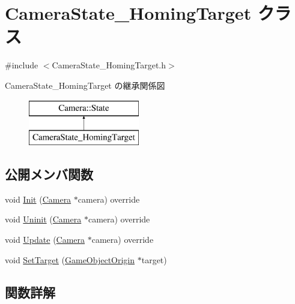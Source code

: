 \hypertarget{class_camera_state___homing_target}{}\section{Camera\+State\+\_\+\+Homing\+Target クラス}
\label{class_camera_state___homing_target}


{\ttfamily \#include $<$Camera\+State\+\_\+\+Homing\+Target.\+h$>$}

Camera\+State\+\_\+\+Homing\+Target の継承関係図\begin{figure}[H]
\begin{center}
\leavevmode
\includegraphics[height=2.000000cm]{class_camera_state___homing_target}
\end{center}
\end{figure}
\subsection*{公開メンバ関数}
\begin{DoxyCompactItemize}
\item 
void \mbox{\hyperlink{class_camera_state___homing_target_a9222190a5f26d564e99623b05941d382}{Init}} (\mbox{\hyperlink{class_camera}{Camera}} $\ast$camera) override
\item 
void \mbox{\hyperlink{class_camera_state___homing_target_a5b4abde99047da6a20f299990c259ef1}{Uninit}} (\mbox{\hyperlink{class_camera}{Camera}} $\ast$camera) override
\item 
void \mbox{\hyperlink{class_camera_state___homing_target_a98f04985c06033febdad32d6357088c9}{Update}} (\mbox{\hyperlink{class_camera}{Camera}} $\ast$camera) override
\item 
void \mbox{\hyperlink{class_camera_state___homing_target_af610b65553d715d2991d587665770bb2}{Set\+Target}} (\mbox{\hyperlink{class_game_object_origin}{Game\+Object\+Origin}} $\ast$target)
\end{DoxyCompactItemize}


\subsection{関数詳解}
\mbox{\label{class_camera_state___homing_target_a9222190a5f26d564e99623b05941d382}} 
